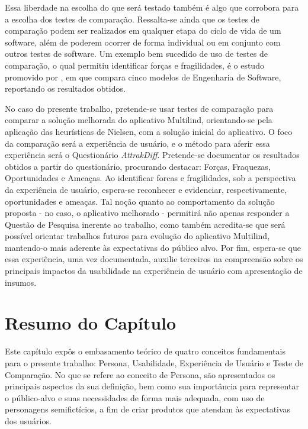 Essa liberdade na escolha do que será testado também é algo que corrobora para a escolha dos testes de comparação. Ressalta-se ainda que os testes de comparação podem ser realizados em qualquer etapa 
do ciclo de vida de um software, além de poderem ocorrer de forma individual ou em conjunto com outros testes de software. Um exemplo bem sucedido de uso de testes de comparação, o qual permitiu identificar 
forças e fragilidades, é o estudo promovido por , em que compara cinco modelos de Engenharia de Software, reportando os resultados obtidos. 

No caso do presente trabalho, pretende-se usar testes de comparação para comparar a solução melhorada do aplicativo Multilind, orientando-se pela aplicação das heurísticas de Nielsen, com a solução inicial 
do aplicativo. O foco da comparação será a experiência de usuário, e o método para aferir essa experiência será o Questionário \textit{AttrakDiff}. Pretende-se documentar os resultados obtidos a partir do questionário, 
procurando destacar: Forças, Fraquezas, Oportunidades e Ameaças. Ao identificar forcas e fragilidades, sob a perspectiva da experiência de usuário, espera-se reconhecer e evidenciar, respectivamente, oportunidades 
e ameaças. Tal noção quanto ao comportamento da solução proposta - no caso, o aplicativo melhorado - permitirá não apenas responder a Questão de Pesquisa inerente ao trabalho, como também acredita-se que será 
possível orientar trabalhos futuros para evolução do aplicativo Multilind, mantendo-o mais aderente às expectativas do público alvo. Por fim, espera-se que essa experiência, uma vez documentada, auxilie terceiros 
na compreensão sobre os principais impactos da usabilidade na experiência de usuário com apresentação de insumos.


\section{Resumo do Capítulo}
\label{sec:Resumo do Capítulo}

Este capítulo expôs o embasamento teórico de quatro conceitos fundamentais para o presente trabalho: Persona, Usabilidade, Experiência de Usuário e Teste de Comparação. No que se 
refere ao conceito de Persona, são apresentados os principais aspectos da sua definição, bem como sua importância para representar o público-alvo e suas necessidades de forma mais adequada, 
com uso de personagens semifictícios, a fim de criar produtos que atendam às expectativas dos usuários. 

